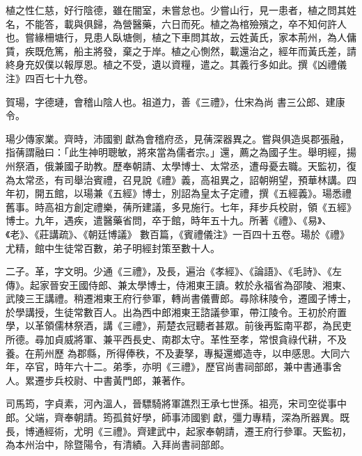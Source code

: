 \begin{pinyinscope}
 植之性仁慈，好行陰德，雖在闇室，未嘗怠也。少嘗山行，見一患者，植之問其姓名，不能答，載與俱歸，為營醫藥，六日而死。植之為棺殮殯之，卒不知何許人也。嘗緣柵塘行，見患人臥塘側，植之下車問其故，云姓黃氏，家本荊州，為人傭賃，疾既危篤，船主將發，棄之于岸。植之心惻然，載還治之，經年而黃氏差，請終身充奴僕以報厚恩。植之不受，遺以資糧，遣之。其義行多如此。撰《凶禮儀注》四百七十九卷。



 賀瑒，字德璉，會稽山陰人也。祖道力，善《三禮》，仕宋為尚
 書三公郎、建康令。



 瑒少傳家業。齊時，沛國劉獻為會稽府丞，見蒨深器異之。嘗與俱造吳郡張融，指蒨謂融曰：「此生神明聰敏，將來當為儒者宗。」還，薦之為國子生。舉明經，揚州祭酒，俄兼國子助教。歷奉朝請、太學博士、太常丞，遭母憂去職。天監初，復為太常丞，有司舉治賓禮，召見說《禮》義，高祖異之，詔朝朔望，預華林講。四年初，開五館，以瑒兼《五經》博士，別詔為皇太子定禮，撰《五經義》。瑒悉禮舊事。時高祖方創定禮樂，蒨所建議，多見施行。七年，拜步兵校尉，領《五經》博士。九年，遇疾，遣醫藥省問，卒于館，時年五十九。所著《禮》、《易》、《老》、《莊講疏》、《朝廷博議》
 數百篇，《賓禮儀注》一百四十五卷。瑒於《禮》尤精，館中生徒常百數，弟子明經封策至數十人。



 二子。革，字文明。少通《三禮》，及長，遍治《孝經》、《論語》、《毛詩》、《左傳》。起家晉安王國侍郎、兼太學博士，侍湘東王讀。敕於永福省為邵陵、湘東、武陵三王講禮。稍遷湘東王府行參軍，轉尚書儀曹郎。尋除秣陵令，遷國子博士，於學講授，生徒常數百人。出為西中郎湘東王諮議參軍，帶江陵令。王初於府置學，以革領儒林祭酒，講《三禮》，荊楚衣冠聽者甚眾。前後再監南平郡，為民吏所德。尋加貞威將軍、兼平西長史、南郡太守。革性至孝，常恨貪祿代耕，不及養。在荊州歷
 為郡縣，所得俸秩，不及妻孥，專擬還鄉造寺，以申感思。大同六年，卒官，時年六十二。弟季，亦明《三禮》，歷官尚書祠部郎，兼中書通事舍人。累遷步兵校尉、中書黃門郎，兼著作。



 司馬筠，字貞素，河內溫人，晉驃騎將軍譙烈王承七世孫。祖亮，宋司空從事中郎。父端，齊奉朝請。筠孤貧好學，師事沛國劉獻，彊力專精，深為所器異。既長，博通經術，尤明《三禮》。齊建武中，起家奉朝請，遷王府行參軍。天監初，為本州治中，除暨陽令，有清績。入拜尚書祠部郎。




\end{pinyinscope}
